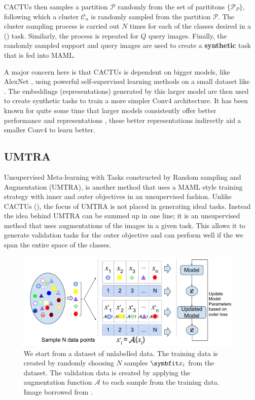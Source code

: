 CACTUs then samples a partition $\mathcal{P}$ randomly from the set of parititons $\{\mathcal{P}_P\}$, following which a cluster $\mathcal{C}_n$ is randomly sampled from the partition $\mathcal{P}$. The cluster sampling process is carried out $N$ times for each of the classes desired in a () task. Similarly, the process is repeated for $Q$ query images. Finally, the randomly sampled support and query images are used to create a \textbf{synthetic} task that is fed into MAML.

A major concern here is that CACTUs is dependent on bigger models, like AlexNet \parencite{AlexNet2012}, using powerful self-supervised learning methods on a small dataset like \miniImagenet{}. The embeddings (representations) generated by this larger model are then used to create synthetic tasks to train a more simpler Conv$4$ architecture. It has been known for quite some time that larger models consistently offer better performance and representations \parencite{Dosovitskiy2020, He2015}, these better representations indirectly aid a smaller Conv$4$ to learn better.

\subsection{UMTRA} \label{ssec:umtra}

Unsupervised Meta-learning with Tasks constructed by Random sampling and Augmentation (UMTRA), is another method that uses a MAML style training strategy with inner and outer objectives in an unsupervised fashion.
Unlike CACTUs (), the focus of UMTRA is not placed in generating ideal tasks. 
Instead the idea behind UMTRA can be summed up in one line; it is an unsupervised method that uses augmentations of the images in a given task. This allows it to generate  validation tasks for the outer objective and can perform well if the we span the entire space of the classes.

\begin{figure}[ht]
    \centering
    \includegraphics[width=\linewidth]{chapters/assets/fsl/UnsupervisedMetaTraining3.pdf}
    \caption{We start from a dataset of unlabelled data. The training data is created by randomly choosing $N$ samples $\bfitx_i$ from the dataset. The validation data is created by applying the augmentation function $\mathcal{A}$ to each sample from the training data. Image borrowed from \parencite{Khodadadeh2018UnsupervisedClassification}.}
    \label{fig:umtra}
\end{figure}

